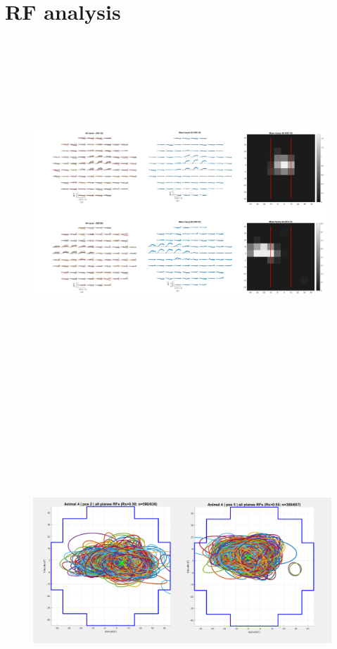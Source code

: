 \section{RF analysis}

\begin{figure}[H] \centering \includegraphics[width=13cm,height=13cm,keepaspectratio]{Figures/7.Results/rf/rfs.png} 
\end{figure}

\begin{figure}[H] \centering \includegraphics[width=13cm,height=13cm,keepaspectratio]{Figures/7.Results/rf/ellipsesAnimal4pos2andpos5.png} 
\end{figure}

